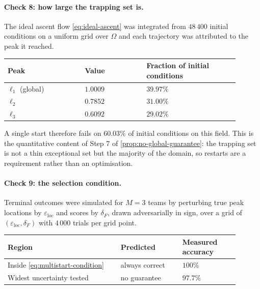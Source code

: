 \documentclass[11pt,a4paper]{article}
\theoremstyle{plain}
\theoremstyle{definition}
\newcommand{\NotationContext}[1]{\markboth{#1}{#1}}
\begin{document}
\paragraph{Check 8: how large the trapping set is.}
The ideal ascent flow \eqref{eq:ideal-ascent} was integrated from $48\,400$ initial conditions on
a uniform grid over $\Omega$ and each trajectory was attributed to the peak it reached.

\begin{center}
\begin{longtable}{@{}p{0.30\linewidth}p{0.24\linewidth}p{0.36\linewidth}@{}}
\toprule
Peak & Value & Fraction of initial conditions \\
\midrule
\endhead
$\ell_1$ (global) & $1.0009$ & $39.97\%$ \\
$\ell_2$ & $0.7852$ & $31.00\%$ \\
$\ell_3$ & $0.6092$ & $29.02\%$ \\
\bottomrule
\end{longtable}
\end{center}

A single start therefore fails on $60.03\%$ of initial conditions on this field. This is the
quantitative content of Step 7 of \cref{prop:no-global-guarantee}: the trapping set is not a thin
exceptional set but the majority of the domain, so restarts are a requirement rather than an
optimisation.

\paragraph{Check 9: the selection condition.}
\NotationContext{multistart}
Terminal outcomes were simulated for $M=3$ teams by perturbing true peak locations by
$\varepsilon_{\mathrm{loc}}$ and scores by $\delta_F$, drawn adversarially in sign, over a grid of
$(\varepsilon_{\mathrm{loc}},\delta_F)$ with $4\,000$ trials per grid point.

\begin{center}
\begin{longtable}{@{}p{0.44\linewidth}p{0.24\linewidth}p{0.22\linewidth}@{}}
\toprule
Region & Predicted & Measured accuracy \\
\midrule
\endhead
Inside \eqref{eq:multistart-condition} & always correct & $100\%$ \\
Widest uncertainty tested & no guarantee & $97.7\%$ \\
\bottomrule
\end{longtable}
\end{center}
\end{document}
